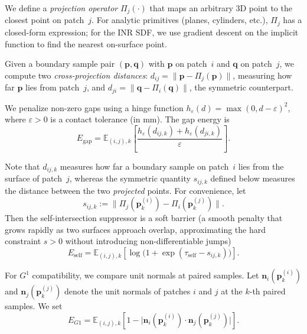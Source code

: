 \documentclass{ieeeaccess}
\begin{document}
We define a \emph{projection operator} $\Pi_j(\cdot)$ that maps an
arbitrary 3D point to the closest point on patch~$j$.
For analytic primitives (planes, cylinders, etc.), $\Pi_j$ has a
closed-form expression; for the INR SDF, we use gradient descent
on the implicit function to find the nearest on-surface point.

Given a boundary sample pair $(\mathbf{p},\mathbf{q})$ with $\mathbf{p}$
on patch~$i$ and $\mathbf{q}$ on patch~$j$, we compute two
\emph{cross-projection distances}:
$d_{ij}=\|\mathbf{p}-\Pi_j(\mathbf{p})\|$, measuring how far
$\mathbf{p}$ lies from patch~$j$, and
$d_{ji}=\|\mathbf{q}-\Pi_i(\mathbf{q})\|$, the symmetric counterpart.

We penalize non-zero gaps using a hinge function
$h_\varepsilon(d)=\max(0,d-\varepsilon)^2$, where $\varepsilon>0$ is a
contact tolerance (in mm). The gap energy is
\begin{equation}
E_{\mathrm{gap}}
= \mathbb{E}_{(i,j),k}\!\left[
\frac{h_{\varepsilon}(d_{ij,k})+h_{\varepsilon}(d_{ji,k})}{\varepsilon}
\right].
\end{equation}

Note that $d_{ij,k}$ measures how far a boundary sample on patch~$i$ lies from the surface of patch~$j$, whereas the symmetric quantity $s_{ij,k}$ defined below measures the distance between the two \emph{projected} points. For convenience, let
\begin{equation}
s_{ij,k}
:= \bigl\|\Pi_j(\mathbf{p}^{(i)}_k)
      - \Pi_i(\mathbf{p}^{(j)}_k)\bigr\|.
\end{equation}
Then the self-intersection suppressor is a soft barrier (a smooth penalty that grows rapidly as two surfaces approach overlap, approximating the hard constraint $s>0$ without introducing non-differentiable jumps)
\begin{equation}
E_{\mathrm{self}}
= \mathbb{E}_{(i,j),k}\!\left[
  \log\!\bigl(1 + \exp(\tau_{\mathrm{self}} - s_{ij,k})\bigr)
\right].
\end{equation}

For $G^1$ compatibility, we compare unit normals at paired samples. Let
$\mathbf{n}_i(\mathbf{p}^{(i)}_k)$ and $\mathbf{n}_j(\mathbf{p}^{(j)}_k)$
denote the unit normals of patches $i$ and $j$ at the $k$-th paired samples.
We set
\begin{equation}
E_{G1}
= \mathbb{E}_{(i,j),k}\!\left[
1 - \bigl|\mathbf{n}_i(\mathbf{p}^{(i)}_k) \cdot
          \mathbf{n}_j(\mathbf{p}^{(j)}_k)\bigr|
\right].
\end{equation}
\end{document}
